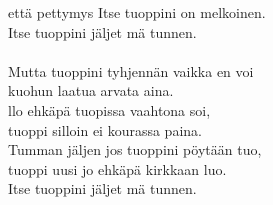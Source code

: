         että pettymys Itse tuoppini on melkoinen. \\
        Itse tuoppini jäljet mä tunnen. \\
\hspace{10mm} \\
        Mutta tuoppini tyhjennän vaikka en voi \\
        kuohun laatua arvata aina. \\
        llo ehkäpä tuopissa vaahtona soi, \\
        tuoppi silloin ei kourassa paina. \\
        Tumman jäljen jos tuoppini pöytään tuo, \\
        tuoppi uusi jo ehkäpä kirkkaan luo. \\
        Itse tuoppini jäljet mä tunnen. \\
